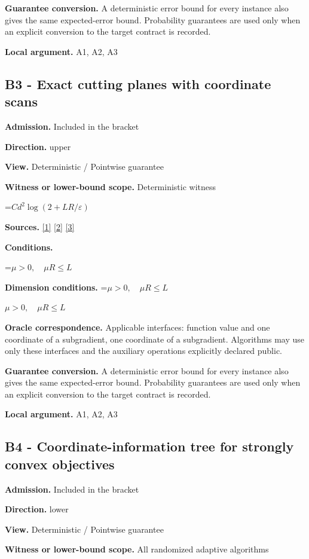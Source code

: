 \documentclass[10pt,a4paper]{article}
\newcommand{\AtlasMath}[1]{\par\begingroup\centering\setbox0=\hbox{$\displaystyle #1$}\ifdim\wd0>1.4\linewidth\typeout{ATLAS WIDE FORMULA: \the\wd0}\fi\ifdim\wd0>\linewidth\resizebox{\linewidth}{!}{\box0}\else\box0\fi\par\endgroup}
\newcommand{\AtlasInlineMath}[1]{\begingroup\setbox0=\hbox{$#1$}\ifdim\wd0>.4\linewidth\endgroup\AtlasMath{#1}\else\endgroup$#1$\fi}
\begin{document}
\textbf{Guarantee conversion.} A deterministic error bound for every instance also gives the same expected-error bound. Probability guarantees are used only when an explicit conversion to the target contract is recorded.

\textbf{Local argument.} A1, A2, A3

\subsection{B3 - Exact cutting planes with coordinate scans}
\textbf{Admission.} Included in the bracket

\textbf{Direction.} upper

\textbf{View.} Deterministic / Pointwise guarantee

\textbf{Witness or lower-bound scope.} Deterministic witness

\AtlasMath{Cd^2\log(2+LR/\varepsilon)}
\textbf{Sources.} \href{https://arxiv.org/pdf/1405.4980}{[1]} \href{https://www2.isye.gatech.edu/~nemirovs/MOR_AccuracyCertificates.pdf}{[2]} \href{https://arxiv.org/pdf/2609.20701}{[3]}

\textbf{Conditions.} 
\AtlasMath{\mu>0,\quad\mu R\le L}


\textbf{Dimension conditions.} \AtlasInlineMath{\mu>0,\quad\mu R\le L}

\textbf{Oracle correspondence.} Applicable interfaces: function value and one coordinate of a subgradient, one coordinate of a subgradient. Algorithms may use only these interfaces and the auxiliary operations explicitly declared public.

\textbf{Guarantee conversion.} A deterministic error bound for every instance also gives the same expected-error bound. Probability guarantees are used only when an explicit conversion to the target contract is recorded.

\textbf{Local argument.} A1, A2, A3

\subsection{B4 - Coordinate-information tree for strongly convex objectives}
\textbf{Admission.} Included in the bracket

\textbf{Direction.} lower

\textbf{View.} Deterministic / Pointwise guarantee

\textbf{Witness or lower-bound scope.} All randomized adaptive algorithms
\end{document}

